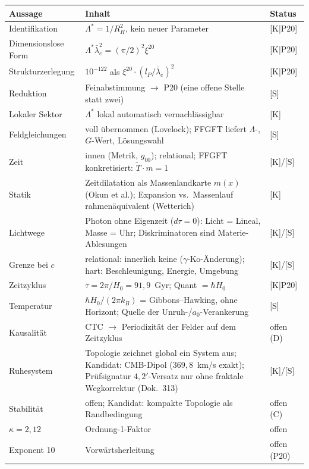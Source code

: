 \documentclass[11pt]{report}
\begin{document}
\begin{center}
\begin{tabular}{lp{6.5cm}l}
\toprule
Aussage & Inhalt & Status \\
\midrule
Identifikation & $\Lambda^{*} = 1/R_H^2$, kein neuer Parameter
  & [K|P20] \\
Dimensionslose Form & $\Lambda^{*}\bar\lambda_e^2 = (\pi/2)^2\xi^{20}$
  & [K|P20] \\
Strukturzerlegung & $10^{-122}$ als $\xi^{20}\cdot(l_P/\bar\lambda_e)^2$
  & [K|P20] \\
Reduktion & Feinabstimmung $\to$ P20 (eine offene Stelle statt zwei)
  & [S] \\
Lokaler Sektor & $\Lambda^{*}$ lokal automatisch vernachlässigbar
  & [K] \\
Feldgleichungen & voll übernommen (Lovelock); FFGFT liefert
  $\Lambda$-, $G$-Wert, Lösungswahl & [S] \\
Zeit & innen (Metrik, $g_{00}$); relational; FFGFT konkretisiert:
  $\tilde T \cdot m = 1$ & [K]/[S] \\
Statik & Zeitdilatation als Massenlandkarte $m(x)$ (Okun et al.);
  Expansion vs.\ Massenlauf rahmenäquivalent (Wetterich) & [K] \\
Lichtwege & Photon ohne Eigenzeit ($d\tau=0$): Licht = Lineal,
  Masse = Uhr; Diskriminatoren sind Materie-Ablesungen & [K]/[S] \\
Grenze bei $c$ & relational: innerlich keine ($\gamma$-Ko-Änderung);
  hart: Beschleunigung, Energie, Umgebung & [K]/[S] \\
Zeitzyklus & $\tau = 2\pi/H_0 = 91{,}9$~Gyr; Quant $= \hbar H_0$
  & [K|P20] \\
Temperatur & $\hbar H_0/(2\pi k_B)$ = Gibbons--Hawking, ohne
  Horizont; Quelle der Unruh-/$a_0$-Verankerung & [S] \\
Kausalität & CTC $\to$ Periodizität der Felder auf dem Zeitzyklus
  & offen (D) \\
Ruhesystem & Topologie zeichnet global ein System aus; Kandidat:
  CMB-Dipol ($369{,}8$~km/s exakt); Prüfsignatur $4{,}2'$-Versatz
  nur ohne fraktale Wegkorrektur (Dok.~313) & [K]/[S] \\
Stabilität & offen; Kandidat: kompakte Topologie als Randbedingung
  & offen (C) \\
$\kappa = 2{,}12$ & Ordnung-1-Faktor & offen \\
Exponent 10 & Vorwärtsherleitung & offen (P20) \\
\bottomrule
\end{tabular}
\end{center}
\end{document}
